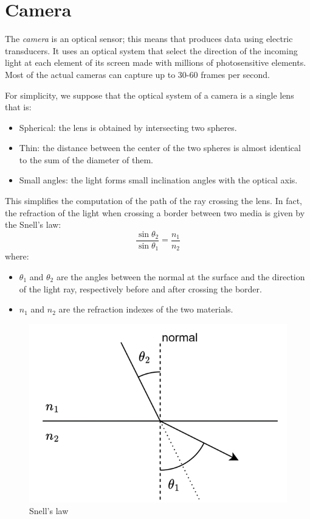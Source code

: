 \documentclass[12pt, a4paper]{report}
\begin{document}
    \section{Camera}
    \begin{definition}
    The \emph{camera} is an optical sensor; this means that produces data using electric transducers. It uses an optical system that select the direction of the incoming light at each 
    element of its screen made with millions of photosensitive elements. Most of the actual cameras can capture up to 30-60 frames per second. 
    \end{definition}
    For simplicity, we suppose that the optical system of a camera is a single lens that is:
    \begin{itemize}
        \item Spherical: the lens is obtained by intersecting two spheres. 
        \item Thin: the distance between the center of the two spheres is almost identical to the sum of the diameter of them. 
        \item Small angles: the light forms small inclination angles with the optical axis.
    \end{itemize}
    This simplifies the computation of the path of the ray crossing the lens. In fact, the refraction of the light when crossing a border between two media is given by the Snell's law: 
    \[\dfrac{\sin{\theta_2}}{\sin{\theta_1}}=\dfrac{n_1}{n_2}\]
    where: 
    \begin{itemize}
        \item $\theta_1$ and $\theta_2$ are the angles between the normal at the surface and the direction of the light ray, respectively before and after crossing the border. 
        \item $n_1$ and $n_2$ are the refraction indexes of the two materials.
    \end{itemize}
    \begin{figure}[H]
        \centering
        \includegraphics[width=0.5\linewidth]{images/refraction.png}
        \caption{Snell's law}
    \end{figure}
\end{document}
